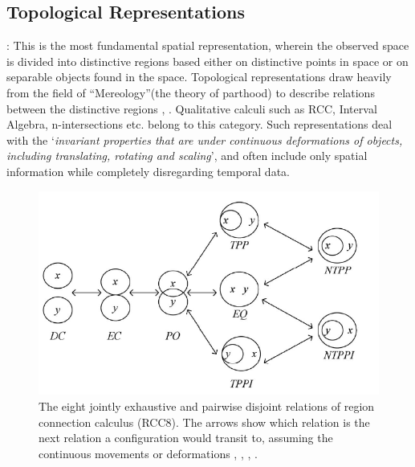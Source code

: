 		
		
		\subsection{Topological Representations} : This is the most fundamental spatial representation\cite{cohn1997qualitative}, \cite{chen2015survey} wherein the observed space is divided into distinctive regions based either on distinctive points in space or on separable objects found in the space. Topological representations draw heavily from the field of ``Mereology''(the theory of parthood) to describe relations between the distinctive regions \cite{cohn2001qualitative}, \cite{cohn2008qualitative}. Qualitative calculi such as RCC, Interval Algebra, n-intersections etc. belong to this category. Such representations deal with the `\textit{invariant properties that are under continuous deformations of objects, including translating, rotating and scaling}', and often include only spatial information while completely disregarding temporal data. 
		
		\begin{figure}[h]
			\centering
			\includegraphics[width=0.7\linewidth]{images/rcc8_rel}
			\caption{The eight jointly exhaustive and pairwise disjoint relations of region connection calculus (RCC8). The arrows show which relation is the next relation a configuration would transit to, assuming the continuous movements or deformations \cite{cohn1997qualitative}, \cite{chen2015survey}, \cite{cohn2001qualitative}, \cite{cohn2008qualitative}.}
			\label{fig:rcc8rel}
		\end{figure}
		
		
